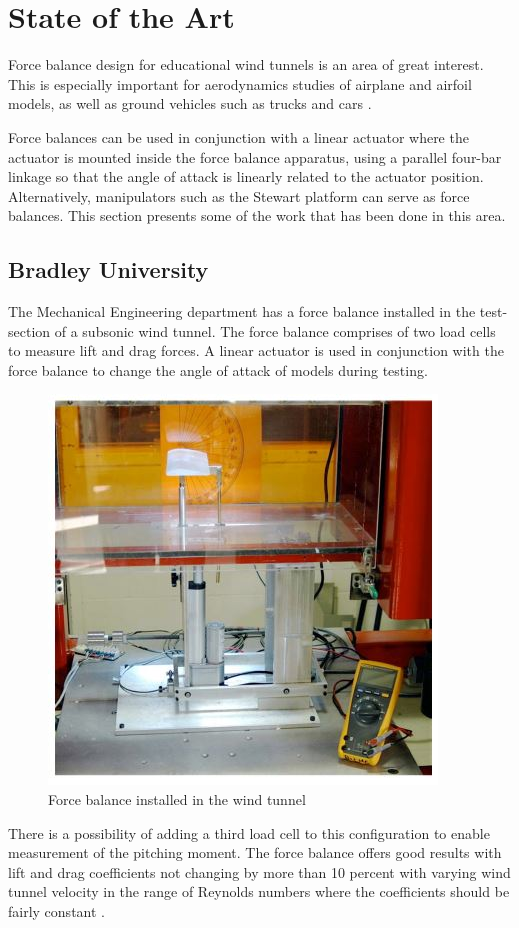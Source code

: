 \section{State of the Art}
Force balance design for educational wind tunnels is an area of great interest. This is especially important
for aerodynamics studies of airplane and airfoil models, as well as ground vehicles such as trucks
and cars \cite{morris_force_2010}.

Force balances can be used in conjunction with a linear actuator where the
actuator is mounted inside the force balance apparatus, using a parallel four-bar linkage so that
the angle of attack is linearly related to the actuator position. Alternatively, manipulators such as the Stewart platform can serve as force balances. This section presents some of the work that has been done in this area.
\subsection{Bradley University}
The Mechanical Engineering department has a force balance installed in the test-section of a subsonic wind tunnel. The force balance comprises of two load cells to measure lift and drag forces. A linear actuator is used in conjunction with the force balance to change the angle of attack of models during testing.
\begin{center}
	\begin{figure}[H]
	\centering
	\includegraphics[width=0.6\linewidth]{Figures/force}
	\caption[Force balance installed]{Force balance installed in the wind tunnel \cite{morris_force_2010}}
	\end{figure}
\end{center}
There is a possibility of adding a third load cell to this configuration to enable measurement of the pitching moment. The force balance offers good results with lift and drag coefficients not changing by more than 10 percent with varying wind tunnel velocity in the range of Reynolds
numbers where the coefficients should be fairly constant \cite{morris_force_2010}.

